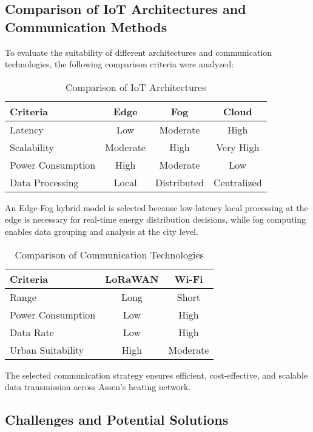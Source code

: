 \documentclass{article}
\begin{document}
\subsection{Comparison of IoT Architectures and Communication Methods}

To evaluate the suitability of different architectures and communication technologies, the following comparison criteria were analyzed:

\begin{table}[h]
\centering
\caption{Comparison of IoT Architectures}
\begin{tabular}{|l|c|c|c|}
\hline
\textbf{Criteria} & \textbf{Edge} & \textbf{Fog} & \textbf{Cloud} \\
\hline
Latency & Low & Moderate & High \\
Scalability & Moderate & High & Very High \\
Power Consumption & High & Moderate & Low \\
Data Processing & Local & Distributed & Centralized \\
\hline
\end{tabular}
\end{table}

An Edge-Fog hybrid model is selected because low-latency local processing at the edge is necessary for real-time energy distribution decisions, while fog computing enables data grouping and analysis at the city level.

\begin{table}[h]
\centering
\caption{Comparison of Communication Technologies}
\begin{tabular}{|l|c|c|}
\hline
\textbf{Criteria} & \textbf{LoRaWAN} & \textbf{Wi-Fi} \\
\hline
Range & Long & Short \\
Power Consumption & Low & High \\
Data Rate & Low & High \\
Urban Suitability & High & Moderate \\
\hline
\end{tabular}
\end{table}

The selected communication strategy ensures efficient, cost-effective, and scalable data transmission across Assen’s heating network.

\subsection{Challenges and Potential Solutions}
\end{document}
